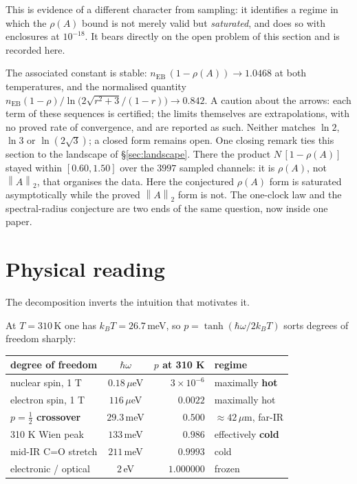 \documentclass[11pt,a4paper]{article}
\theoremstyle{definition}
\theoremstyle{remark}
\newcommand{\nEB}{n_{\mathrm{EB}}}
\newcommand{\opn}[1]{\left\lVert #1 \right\rVert_{2}}
\begin{document}
This is evidence of a different character from sampling: it identifies a regime in which the $\rho(A)$ bound is not merely valid but \emph{saturated}, and does so with enclosures at $10^{-18}$. It bears directly on the open problem of this section and is recorded here.

The associated constant is stable: $\nEB\,(1-\rho(A)) \to 1.0468$ at both temperatures, and the normalised quantity $\nEB(1-\rho)\big/\ln\!\big(2\sqrt{r^2+3}/(1-r)\big) \to 0.842$. A caution about the arrows: each term of these sequences is certified; the limits themselves are extrapolations, with no proved rate of convergence, and are reported as such. Neither matches $\ln 2$, $\ln 3$ or $\ln(2\sqrt3)$; a closed form remains open.
One closing remark ties this section to the landscape of
\S\ref{sec:landscape}. There the product $N\,[1-\rho(A)]$ stayed within
$[0.60,1.50]$ over the $3997$ sampled channels: it is $\rho(A)$, not
$\opn{A}$, that organises the data. Here the conjectured $\rho(A)$ form is
saturated asymptotically while the proved $\opn{A}$ form is not. The
one-clock law and the spectral-radius conjecture are two ends of the same
question, now inside one paper.


\section{Physical reading}\label{sec:physical}

The decomposition inverts the intuition that motivates it.

At $T = 310\,$K one has $k_BT = 26.7\,$meV, so $p = \tanh(\hbar\omega/2k_BT)$ sorts degrees of freedom sharply:

\begin{center}
\begin{tabular}{lcrl}
\toprule
degree of freedom & $\hbar\omega$ & $p$ at 310 K & regime\\
\midrule
nuclear spin, 1 T & $0.18\,\mu$eV & $3\times10^{-6}$ & maximally \textbf{hot}\\
electron spin, 1 T & $116\,\mu$eV & $0.0022$ & maximally hot\\
\textbf{$p = \tfrac12$ crossover} & $29.3\,$meV & $0.500$ & $\approx 42\,\mu$m, far-IR\\
310 K Wien peak & $133\,$meV & $0.986$ & effectively \textbf{cold}\\
mid-IR C=O stretch & $211\,$meV & $0.9993$ & cold\\
electronic / optical & $2\,$eV & $1.000000$ & frozen\\
\bottomrule
\end{tabular}
\end{center}
\end{document}
